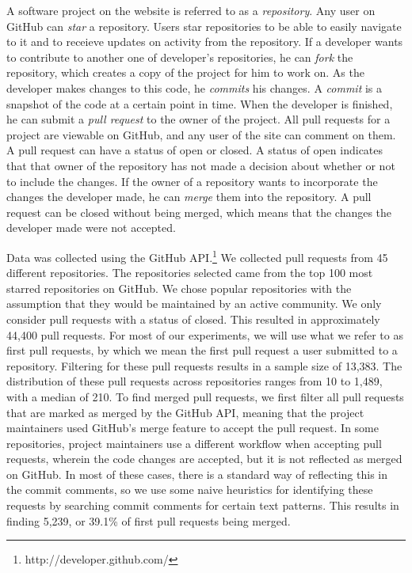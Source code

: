 \documentclass{iitthesis}
\begin{document}

 \label{sec:terms}

A software project on the website is referred to as a \textit{repository}. Any
user on GitHub can \textit{star} a repository. Users star repositories to be
able to easily navigate to it and to receieve updates on activity from the
repository. If a developer wants to contribute to another one of developer's
repositories, he can \textit{fork} the repository, which creates a copy of the
project for him to work on. As the developer makes changes to this code, he
\textit{commits} his changes. A \textit{commit} is a snapshot of the code at a
certain point in time. When the developer is finished, he can submit a
\textit{pull request} to the owner of the project. All pull requests for a
project are viewable on GitHub, and any user of the site can comment on them. A
pull request can have a status of open or closed. A status of open indicates
that that owner of the repository has not made a decision about whether or not
to include the changes. If the owner of a repository wants to incorporate the
changes the developer made, he can \textit{merge} them into the repository. A
pull request can be closed without being merged, which means that the changes
the developer made were not accepted.

 \label{sec:datacollection}

Data was collected using the GitHub API.\footnote{http://developer.github.com/}
We collected pull requests from 45 different repositories. The repositories
selected came from the top 100 most starred repositories on GitHub. We chose
popular repositories with the assumption that they would be maintained by an
active community. We only consider pull requests with a status of closed. This
resulted in approximately 44,400 pull requests. For most of our experiments, we
will use what we refer to as first pull requests, by which we mean the first
pull request a user submitted to a repository. Filtering for these pull requests
results in a sample size of 13,383. The distribution of these pull requests
across repositories ranges from 10 to 1,489, with a median of 210. To find
merged pull requests, we first filter all pull requests that are marked as
merged by the GitHub API, meaning that the project maintainers used GitHub's
merge feature to accept the pull request. In some repositories, project
maintainers use a different workflow when accepting pull requests, wherein the
code changes are accepted, but it is not reflected as merged on GitHub. In most
of these cases, there is a standard way of reflecting this in the commit
comments, so we use some naive heuristics for identifying these requests by
searching commit comments for certain text patterns. This results in finding
5,239, or 39.1\% of first pull requests being merged.
\end{document}
